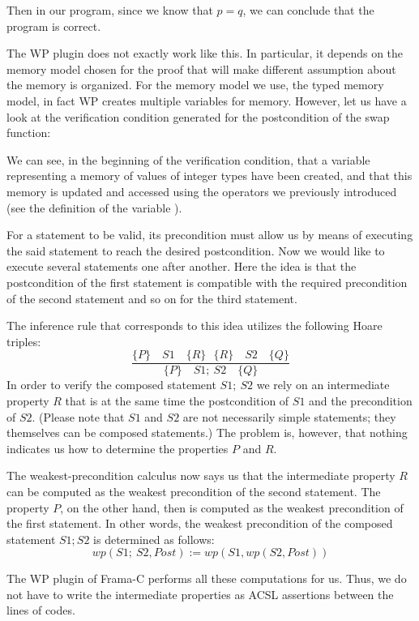 Then in our program, since we know that $p = q$, we can conclude that the program
is correct.


The WP plugin does not exactly work like this. In particular, it depends on the
memory model chosen for the proof that will make different assumption about the
memory is organized. For the memory model we use, the typed memory model, in
fact WP creates multiple variables for memory. However, let us have a look at
the verification condition generated for the postcondition of the swap function:




We can see, in the beginning of the verification condition, that a variable
 representing a memory of values of integer types have been
created, and that this memory is updated and accessed using the operators we
previously introduced (see the definition of the variable ).



For a statement to be valid, its precondition must allow us by means of
executing the said statement to reach the desired postcondition. Now we
would like to execute several statements one after another. Here the
idea is that the postcondition of the first statement is compatible with
the required precondition of the second statement and so on for the
third statement.



The inference rule that corresponds to this idea utilizes the following
Hoare triples:
$$\dfrac{\{P\}\quad S1 \quad \{R\} \ \ \ \{R\}\quad S2 \quad \{Q\}}{\{P\}\quad S1 ;\ S2 \quad \{Q\}}$$
In order to verify the composed statement $S1;\ S2$ we rely on an
intermediate property $R$ that is at the same time the postcondition
of $S1$ and the precondition of $S2$. (Please note that $S1$ and
$S2$ are not necessarily simple statements; they themselves can be
composed statements.) The problem is, however, that nothing indicates us
how to determine the properties $P$ and $R$.

The weakest-precondition calculus now says us that the intermediate
property $R$ can be computed as the weakest precondition of the second
statement. The property $P$, on the other hand, then is computed as
the weakest precondition of the first statement. In other words, the
weakest precondition of the composed statement $S1; S2$ is determined
as follows:
$$wp(S1;\ S2 , Post) := wp(S1, wp(S2, Post) )$$


The WP plugin of Frama-C performs all these computations for us. Thus,
we do not have to write the intermediate properties as ACSL assertions
between the lines of codes.



